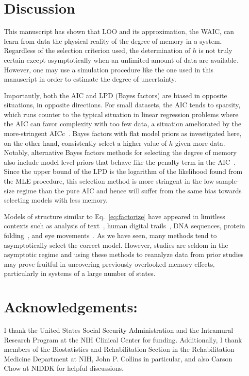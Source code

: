 \documentclass{IOS-Book-Article}
\begin{document}
\section{Discussion}

This manuscript has shown that LOO and its approximation, the WAIC, can learn from data the physical reality of the 
degree of memory in a system. Regardless of the selection criterion used, the determination of $h$ is not truly certain except asymptotically when an unlimited amount of data are available. However, one may use a simulation procedure like the one used in this manuscript in order to estimate the degree of uncertainty.  

Importantly, both the AIC and LPD (Bayes factors) are biased in opposite situations, in opposite directions. For small datasets, the AIC tends to sparsity, which runs counter to the typical situation in linear regression problems where the AIC can favor complexity with too few data, a situation ameliorated by the more-stringent AICc~\cite{claeskens2008model}. Bayes factors with flat model  priors as investigated here, on the other hand, consistently select a higher value of $h$ given more data.
%
Notably, alternative Bayes factors methods for selecting the degree of memory also include model-level priors that behave like the penalty term in the AIC~\cite{strelioff2007inferring,singer2014detecting}. Since the upper bound of the LPD is the logarithm of the likelihood found from the MLE procedure, this selection method is more stringent in the low sample-size regime than the pure AIC and hence will suffer from the same bias towards selecting models with less memory.


Models of structure similar to Eq.~\ref{eq:factorize} have appeared in limitless contexts such as analysis of text~\cite{melnyk2006memory}, human digital trails~\cite{singer2014detecting}, DNA sequences, protein folding~\cite{yuan1999prediction}, and eye movements~\cite{bettenbuhl2012bayesian}. As we have seen, many methods tend to asymptotically select the correct model. However, studies are seldom in the asymptotic regime and using these methods  to reanalyze data from prior studies may prove fruitful in uncovering previously overlooked memory effects, particularly in systems of a large number of states. 


\section{Acknowledgements:} I thank the United States Social Security Administration and the Intramural Research Program at the NIH Clinical Center for funding. Additionally, I thank members of the Biostatistics and Rehabilitation Section in the Rehabilitation Medicine Department at NIH, John P. Collins in particular, and also Carson Chow at NIDDK for helpful discussions.



 
\end{document}
